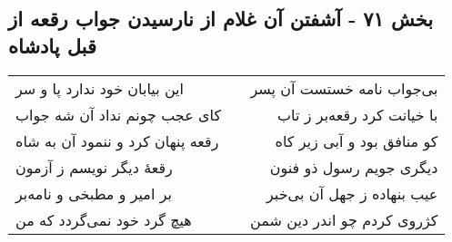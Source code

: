 \begin{center}
\section*{بخش ۷۱ - آشفتن آن غلام از نارسیدن جواب رقعه از قبل پادشاه}
\label{sec:sh071}
\begin{longtable}{l p{0.5cm} r}
این بیابان خود ندارد پا و سر
&&
بی‌جواب نامه خستست آن پسر
\\
کای عجب چونم نداد آن شه جواب
&&
با خیانت کرد رقعه‌بر ز تاب
\\
رقعه پنهان کرد و ننمود آن به شاه
&&
کو منافق بود و آبی زیر کاه
\\
رقعهٔ دیگر نویسم ز آزمون
&&
دیگری جویم رسول ذو فنون
\\
بر امیر و مطبخی و نامه‌بر
&&
عیب بنهاده ز جهل آن بی‌خبر
\\
هیچ گرد خود نمی‌گردد که من
&&
کژروی کردم چو اندر دین شمن
\\
\end{longtable}
\end{center}
